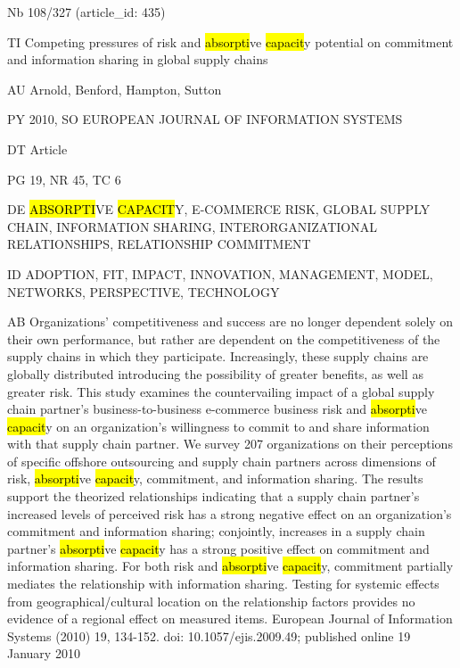 \documentclass[a4paper]{article}
\begin{document}
\vspace*{-2cm}
Nb \tabto{0cm}108/327 (article\_id: 435)\par
TI \tabto{0cm}Competing pressures of risk and \hl{absorpti}ve \hl{capacit}y potential on commitment and information sharing in global supply chains\par
AU \tabto{0cm}Arnold, Benford, Hampton, Sutton\par
PY \tabto{0cm}2010, SO EUROPEAN JOURNAL OF INFORMATION SYSTEMS\par
DT \tabto{0cm}Article\par
PG \tabto{0cm}19, NR 45, TC 6\par
DE \tabto{0cm}\hl{ABSORPTI}VE \hl{CAPACIT}Y, E-COMMERCE RISK, GLOBAL SUPPLY CHAIN, INFORMATION SHARING, INTERORGANIZATIONAL RELATIONSHIPS, RELATIONSHIP COMMITMENT\par
ID \tabto{0cm}ADOPTION, FIT, IMPACT, INNOVATION, MANAGEMENT, MODEL, NETWORKS, PERSPECTIVE, TECHNOLOGY\par
AB \tabto{0cm}Organizations' competitiveness and success are no longer dependent solely on their own performance, but rather are dependent on the competitiveness of the supply chains in which they participate. Increasingly, these supply chains are globally distributed introducing the possibility of greater benefits, as well as greater risk. This study examines the countervailing impact of a global supply chain partner's business-to-business e-commerce business risk and \hl{absorpti}ve \hl{capacit}y on an organization's willingness to commit to and share information with that supply chain partner. We survey 207 organizations on their perceptions of specific offshore outsourcing and supply chain partners across dimensions of risk, \hl{absorpti}ve \hl{capacit}y, commitment, and information sharing. The results support the theorized relationships indicating that a supply chain partner's increased levels of perceived risk has a strong negative effect on an organization's commitment and information sharing; conjointly, increases in a supply chain partner's \hl{absorpti}ve \hl{capacit}y has a strong positive effect on commitment and information sharing. For both risk and \hl{absorpti}ve \hl{capacit}y, commitment partially mediates the relationship with information sharing. Testing for systemic effects from geographical/cultural location on the relationship factors provides no evidence of a regional effect on measured items. European Journal of Information Systems (2010) 19, 134-152. doi: 10.1057/ejis.2009.49; published online 19 January 2010\par
\clearpage
\end{document}
